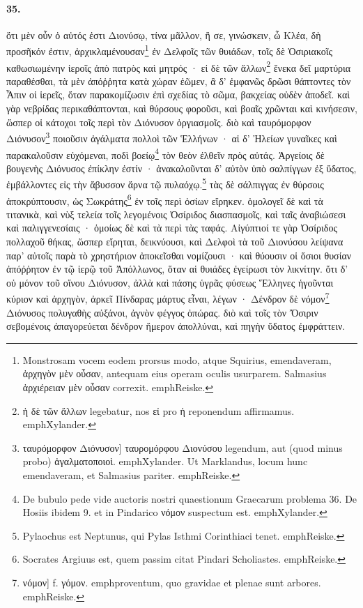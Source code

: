 \documentclass[a4paper, 11pt, oneside, polutonikogreek, german]{article}
\begin{document}
\paragraph{35.}
ὅτι μὲν οὖν ὁ αὐτός ἐστι Διονύσῳ, τίνα μᾶλλον, ἢ σε, γινώσκειν, ὦ Κλέα, δὴ προσῆκόν ἐστιν, ἀρχικλαμένουσαν\footnote{Monstrosam vocem eodem prorsus modo, atque Squirius, emendaveram, ἀρχηγὸν μὲν οὖσαν, antequam eius operam oculis usurparem. Salmasius ἀρχιέρειαν μὲν οὖσαν correxit. emph{Reiske.}} ἐν Δελφοῖς τῶν θυιάδων, τοῖς δὲ Ὀσιριακοῖς καθωσιωμένην ἱεροῖς ἀπὸ πατρὸς καὶ μητρός · εἰ δὲ τῶν ἄλλων\footnote{ἡ δὲ τῶν ἄλλων legebatur, nos εἰ pro ἡ reponendum affirmamus. emph{Xylander.}} ἕνεκα δεῖ μαρτύρια παραθέσθαι, τὰ μὲν ἀπόῤῥητα κατὰ χώραν ἐῶμεν, ἃ δ' ἐμφανῶς δρῶσι θάπτοντες τὸν Ἆπιν οἱ ἱερεῖς, ὅταν παρακομίζωσιν ἐπὶ σχεδίας τὸ σῶμα, βακχείας οὐδὲν ἀποδεῖ. καὶ γὰρ νεβρίδας περικαθάπτονται, καὶ θύρσους φοροῦσι, καὶ βοαῖς χρῶνται καὶ κινήσεσιν, ὥσπερ οἱ κάτοχοι τοῖς περὶ τὸν Διόνυσον ὀργιασμοῖς. διὸ καὶ ταυρόμορφον Διόνυσον\footnote{ταυρόμορφον Διόνυσον] ταυρομόρφου Διονύσου legendum, aut (quod minus probo) ἀγαλματοποιοὶ. emph{Xylander.} Ut Marklandus, locum hunc emendaveram, et Salmasius pariter. emph{Reiske.}} ποιοῦσιν ἀγάλματα πολλοὶ τῶν Ἑλλήνων · αἱ δ' Ἠλείων γυναῖκες καὶ παρακαλοῦσιν εὐχόμεναι, ποδὶ βοείῳ\footnote{De bubulo pede vide auctoris nostri quaestionum Graecarum problema 36. De Hosiis ibidem 9. et in Pindarico νόμον suspectum est. emph{Xylander.}} τὸν θεὸν ἐλθεῖν πρὸς αὐτάς. Ἀργείοις δὲ βουγενὴς Διόνυσος ἐπίκλην ἐστίν · ἀνακαλοῦνται δ' αὐτὸν ὑπὸ σαλπίγγων ἐξ ὕδατος, ἐμβάλλοντες εἰς τὴν ἄβυσσον ἄρνα τῷ πυλαόχῳ.\footnote{Pylaochus est Neptunus, qui Pylas Isthmi Corinthiaci tenet. emph{Reiske.}} τὰς δὲ σάλπιγγας ἐν θύρσοις ἀποκρύπτουσιν, ὡς Σωκράτης\footnote{Socrates Argiuus est, quem passim citat Pindari Scholiastes. emph{Reiske.}} ἐν τοῖς περὶ ὁσίων εἴρηκεν. ὁμολογεῖ δὲ καὶ τὰ τιτανικὰ, καὶ νὺξ τελεία τοῖς λεγομένοις Ὀσίριδος διασπασμοῖς, καὶ ταῖς ἀναβιώσεσι καὶ παλιγγενεσίαις · ὁμοίως δὲ καὶ τὰ περὶ τὰς ταφάς. Αἰγύπτιοί τε γὰρ Ὀσίριδος πολλαχοῦ θήκας, ὥσπερ εἴρηται, δεικνύουσι, καὶ Δελφοὶ τὰ τοῦ Διονύσου λείψανα παρ' αὐτοῖς παρὰ τὸ χρηστήριον ἀποκεῖσθαι νομίζουσι · καὶ θύουσιν οἱ ὅσιοι θυσίαν ἀπόῤῥητον ἐν τῷ ἱερῷ τοῦ Ἀπόλλωνος, ὅταν αἱ θυιάδες ἐγείρωσι τὸν λικνίτην. ὅτι δ' οὐ μόνον τοῦ οἴνου Διόνυσον, ἀλλὰ καὶ πάσης ὑγρᾶς φύσεως Ἕλληνες ἡγοῦνται κύριον καὶ ἀρχηγὸν, ἀρκεῖ Πίνδαρας μάρτυς εἶναι, λέγων · Δένδρον δὲ νόμον\footnote{νόμον] f. γόμον. emph{proventum, quo gravidae et plenae sunt arbores.} emph{Reiske.}} Διόνυσος πολυγαθὴς αὐξάνοι, ἀγνὸν φέγγος ὀπώρας. διὸ καὶ τοῖς τὸν Ὄσιριν σεβομένοις ἀπαγορεύεται δένδρον ἥμερον ἀπολλύναι, καὶ πηγὴν ὕδατος ἐμφράττειν.
\end{document}
